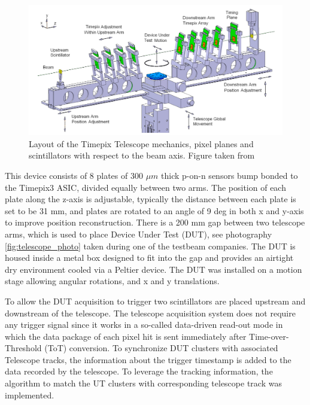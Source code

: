 \begin{figure}[!h]
\centering
\includegraphics{figures/telescope.png}
\caption{Layout of the Timepix Telescope mechanics, pixel planes and scintillators with respect to the beam axis. Figure taken from \cite{telescope}}
\label{fig:telescope}
\end{figure}


This device consists of 8 plates of 300 $\mu m$ thick p-on-n sensors bump bonded to the Timepix3 ASIC, divided equally between two arms. The position of each plate along the z-axis is adjustable, typically the distance between each plate is set to be 31 mm, and plates are rotated to an angle of 9 deg in both x and y-axis to improve position reconstruction. There is a 200 mm gap between two telescope arms, which is used to place Device Under Test (DUT), see photography \ref{fig:telescope_photo} taken during one of the testbeam companies. The DUT is housed inside a metal box designed to fit into the gap and provides an airtight dry environment cooled via a Peltier device. 
The DUT was installed on a motion stage allowing angular rotations, and x and y translations. 

To allow the DUT acquisition to trigger two scintillators are placed upstream and downstream of the telescope. The telescope acquisition system does not require any trigger signal since it works in a so-called data-driven read-out mode in which the data package of each pixel hit is sent immediately after Time-over-Threshold (ToT) conversion. To synchronize DUT clusters with associated Telescope tracks, the information about the trigger timestamp is added to the data recorded by the telescope. To leverage the tracking information, the algorithm to match the UT clusters with corresponding telescope track was implemented. 


